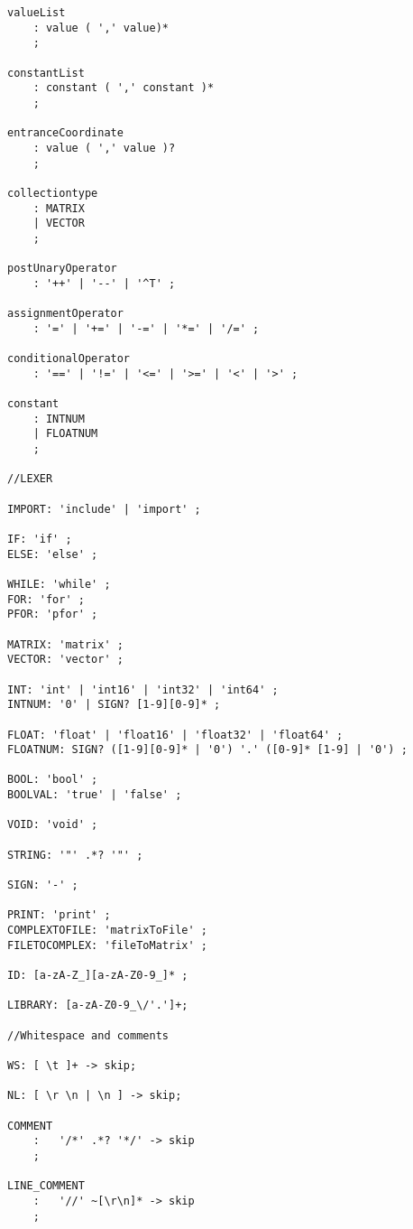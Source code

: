 \begin{lstlisting}[caption={\acrshort{cfg} and Lexing rules},frame=tlrb,numbers=none]
valueList
    : value ( ',' value)*
    ;

constantList
    : constant ( ',' constant )*
    ;

entranceCoordinate
    : value ( ',' value )?
    ;

collectiontype
    : MATRIX   
    | VECTOR    
    ;

postUnaryOperator 
    : '++' | '--' | '^T' ;

assignmentOperator
    : '=' | '+=' | '-=' | '*=' | '/=' ;

conditionalOperator
    : '==' | '!=' | '<=' | '>=' | '<' | '>' ;

constant
    : INTNUM  
    | FLOATNUM 
    ;

//LEXER  

IMPORT: 'include' | 'import' ;  
  
IF: 'if' ;
ELSE: 'else' ;

WHILE: 'while' ;
FOR: 'for' ;   
PFOR: 'pfor' ;

MATRIX: 'matrix' ;
VECTOR: 'vector' ;

INT: 'int' | 'int16' | 'int32' | 'int64' ;
INTNUM: '0' | SIGN? [1-9][0-9]* ;

FLOAT: 'float' | 'float16' | 'float32' | 'float64' ;  
FLOATNUM: SIGN? ([1-9][0-9]* | '0') '.' ([0-9]* [1-9] | '0') ;

BOOL: 'bool' ;
BOOLVAL: 'true' | 'false' ;

VOID: 'void' ;

STRING: '"' .*? '"' ;

SIGN: '-' ;   

PRINT: 'print' ;
COMPLEXTOFILE: 'matrixToFile' ;
FILETOCOMPLEX: 'fileToMatrix' ;

ID: [a-zA-Z_][a-zA-Z0-9_]* ;    

LIBRARY: [a-zA-Z0-9_\/'.']+;

//Whitespace and comments

WS: [ \t ]+ -> skip;

NL: [ \r \n | \n ] -> skip;

COMMENT
    :   '/*' .*? '*/' -> skip
    ;

LINE_COMMENT
    :   '//' ~[\r\n]* -> skip
    ;
                                                
\end{lstlisting}